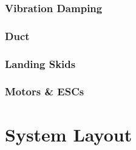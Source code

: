 \subsubsection{Vibration Damping}
\subsubsection{Duct}
\subsubsection{Landing Skids}
\subsubsection{Motors \& ESCs}

\section{System Layout}
\label{sec:proto.layout}
